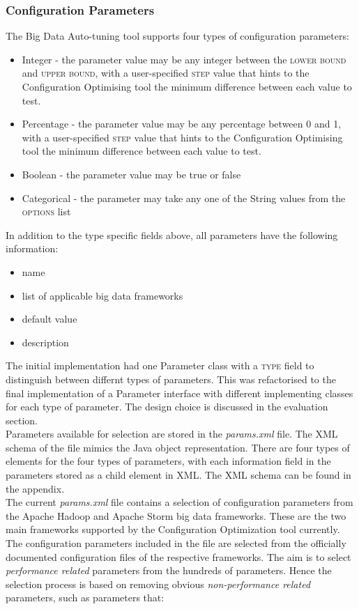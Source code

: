 \subsubsection{Configuration Parameters}
The Big Data Auto-tuning tool supports four types of configuration parameters: 
\begin{itemize}
\item Integer - the parameter value may be any integer between the \textsc{lower bound} and \textsc{upper bound}, with a user-specified \textsc{step} value that hints to the Configuration Optimising tool the minimum difference between each value to test.
\item Percentage - the parameter value may be any percentage between 0 and 1, with a user-specified \textsc{step} value that hints to the Configuration Optimising tool the minimum difference between each value to test.
\item Boolean - the parameter value may be true or false
\item Categorical - the parameter may take any one of the String values from the  \textsc{options} list
\end{itemize}
In addition to the type specific fields above, all parameters have the following information:
\begin{itemize}
\item name
\item list of applicable big data frameworks
\item default value
\item description
\end{itemize}
The initial implementation had one Parameter class with a \textsc{type} field to distinguish between differnt types of parameters. This was refactorised to the final implementation of a Parameter interface with different implementing classes for each type of parameter. The design choice is discussed in the evaluation section.\\
Parameters available for selection are stored in the \textit{params.xml} file. The XML schema of the file mimics the Java object representation. There are four types of elements for the four types of parameters, with each information field in the parameters stored as a child element in XML. The XML schema can be found in the appendix.\\
The current \textit{params.xml} file contains a selection of configuration parameters from the Apache Hadoop and Apache Storm big data frameworks. These are the two main frameworks supported by the Configuration Optimization tool currently. The configuration parameters included in the file are selected from the officially documented configuration files of the respective frameworks. \cite{hadoopconfig} \cite{stormconfig} The aim is to select \textit{performance related} parameters from the hundreds of parameters. Hence the selection process is based on removing obvious \textit{non-performance related} parameters, such as parameters that:
